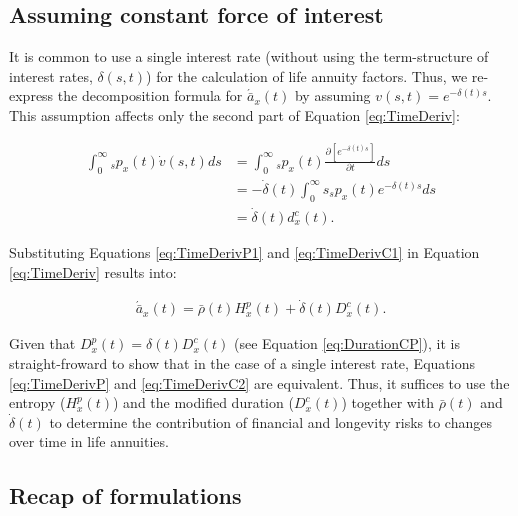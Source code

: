 \documentclass[12pt]{article}
\begin{document}
\subsection{Assuming constant force of interest}


It is common to use a single interest rate (without using the term-structure of interest rates, $\delta(s,t)$) for the calculation of life annuity factors. Thus, we re-express the decomposition formula for $\acute{\bar{a}}_x(t)$ by assuming $v(s,t)=e^{-\delta(t)s}$. This assumption affects only the second part of Equation \ref{eq:TimeDeriv}: 




\begin{equation}\label{eq:TimeDerivC1}
\begin{split}
\int_0^\infty {}_s{p}_x(t) \dot{v}(s,t)ds &=\int_0^\infty {}_s{p}_x(t) \frac{\partial \left[ e^{-\delta(t)s} \right]}{\partial t}ds \\
&=-\dot{\delta}(t)\int_0^\infty s  {}_s{p}_x(t) e^{-\delta(t)s} ds \\
&=  \dot{\delta}(t)  d^{c}_x(t).
\end{split}
\end{equation}

Substituting Equations \ref{eq:TimeDerivP1} and \ref{eq:TimeDerivC1} in Equation \ref{eq:TimeDeriv} results into: 


\begin{equation}\label{eq:TimeDerivC2}
\begin{split}
\acute{\bar{a}}_x(t) =  \bar{\rho}(t){H}^{p}_x(t)+\dot{\delta}(t)  D^{c}_x(t).
\end{split}
\end{equation}



Given that ${D}^{p}_{x}(t)=\delta(t){D}^{c}_{x}(t)$ (see Equation \ref{eq:DurationCP}), it is straight-froward to show that in the case of a single interest rate, Equations \ref{eq:TimeDerivP}  and \ref{eq:TimeDerivC2} are equivalent. Thus, it suffices to use the entropy (${H}^{p}_x(t)$) and the modified duration ($D^{c}_x(t)$) together with $\bar{\rho}(t)$ and $\dot{\delta}(t)$ to determine the contribution of financial and longevity risks to changes over time in life annuities.





\subsection{Recap of formulations}
\end{document}
